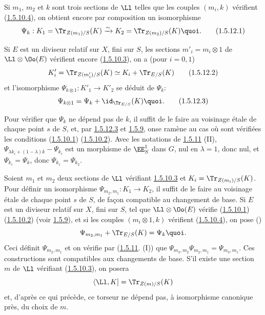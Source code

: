 Si $m_{1}$, $m_{2}$ et $k$ sont trois sections de $\Ll$ telles
que les couples $(m_{i},k)$ vérifient (\hyperref[XVIII.par1.5.10.4]{1.5.10.4}), on
obtient encore par composition un isomorphisme
\begin{equation*}
\Psi_{k}:K_{1}=\Tr_{Z(m_{1})/S}(K)\xrightarrow{\sim}
K_{2}=\Tr_{Z(m_{2})/S}(K){\quoi}.\tag{1.5.12.1}
\end{equation*}

Si $E$ est un diviseur relatif sur $X$, fini sur $S$, les sections
$m'_{i}=m_{i}\otimes 1$ de $\Ll\otimes \Oo(E)$ vérifient
encore (\hyperref[XVIII.par1.5.10.3]{1.5.10.3}), on a (pour $i=0,1$)
\begin{equation*}
K'_{i}=\Tr_{Z(m'_{i})/S}(K)\simeq K_{i}+\Tr_{E/S}(K)\tag{1.5.12.2}
\end{equation*}%
et l'isomorphisme $\Psi_{k\otimes 1}:K'_{1}\rightarrow K'_{2}$ se
déduit de $\Psi_{k}$:
\begin{equation*}
\Psi_{k\otimes 1}=\Psi_{k}+\id_{\Tr_{E/S}}(K){\quoi}.\tag{1.5.12.3}
\end{equation*}

Pour vérifier que $\Psi_{k}$ ne dépend pas de $k$, il suffit de le
faire au voisinage étale de chaque point $s$ de $S$, et, par \hyperref[XVIII.eq1.5.12.3]{1.5.12.3}
et \hyperref[XVIII.lem1.5.9]{1.5.9}, on\pageoriginale se ramène au cas où sont
vérifiées les 
conditions (\hyperref[XVIII.par1.5.10.1]{1.5.10.1}) (\hyperref[XVIII.par1.5.10.2]{1.5.10.2}). Avec
les notations de \hyperref[XVIII.lem1.5.11]{1.5.11} (II), 
$\Psi_{\lambda k_{i}+(1-\lambda)k}-\Psi_{k_{i}}$ est un morphisme de
$\EE^{1}_{S}$ dans $G$, nul en $\lambda =1$, donc nul, et
$\Psi_{k_{i}}=\Psi_{k}$, donc $\Psi_{k_{1}}=\Psi_{k_{2}}$.

Soient $m_{1}$ et $m_{2}$ deux sections de $\Ll$ vérifiant
\hyperref[XVIII.par1.5.10.3]{1.5.10.3} et $K_{i}=\Tr_{Z(m_{i})/S}(K)$. Pour définir
un isomorphisme 
$\Psi_{m_{2},m_{1}}:K_{1}\rightarrow K_{2}$, il suffit de le faire au
voisinage étale de chaque point $s$ de $S$, de façon compatible au
changement de base. Si $E$ est un diviseur relatif sur $X$, fini sur
$S$, tel que $\Ll\otimes \Oo(E)$ vérifie (\hyperref[XVIII.par1.5.10.1]{1.5.10.1})
(\hyperref[XVIII.par1.5.10.2]{1.5.10.2}) (voir \hyperref[XVIII.lem1.5.9]{1.5.9}), et si les
couples $(m_{i}\otimes 1,k)$ 
vérifient (\hyperref[XVIII.par1.5.10.4]{1.5.10.4}), on pose (\cf {})
$$
\Psi_{m_{2},m_{1}}+\Tr_{E/S}(K)=\Psi_{k}{\quoi}.
$$
Ceci définit $\Psi_{m_{2},m_{1}}$ et on vérifie par
(\hyperref[XVIII.lem1.5.11]{1.5.11}. (I)) que $\Psi_{m_{3},
  m_{2}}\Psi_{m_{2},m_{1}}=\Psi_{m_{3},m_{1}}$. Ces 
constructions sont compatibles aux changements de base. S'il existe
une section $m$ de $\Ll$ vérifiant (\hyperref[XVIII.par1.5.10.3]{1.5.10.3}), on posera
$$
\langle \Ll,K]=\Tr_{Z(m)/S}(K)
$$
et, d'après ce qui précède, ce torseur ne dépend pas, à isomorphisme
canonique près, du choix de $m$.

